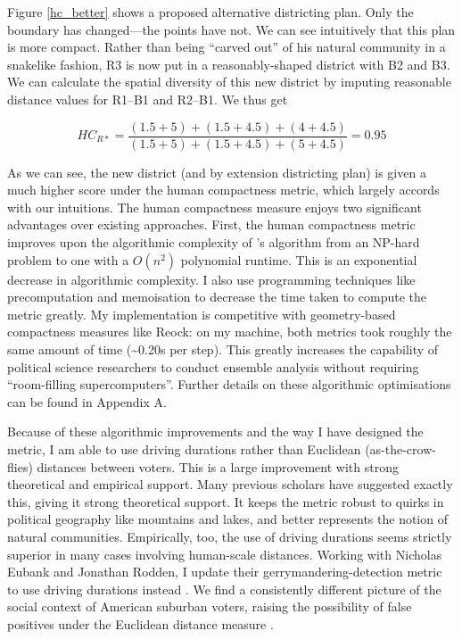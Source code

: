 \documentclass[]{article}
\begin{document}
Figure \ref{hc_better} shows a proposed alternative districting plan.
Only the boundary has changed---the points have not. We can see
intuitively that this plan is more compact. Rather than being ``carved
out'' of his natural community in a snakelike fashion, R3 is now put in
a reasonably-shaped district with B2 and B3. We can calculate the
spatial diversity of this new district by imputing reasonable distance
values for R1--B1 and R2--B1. We thus get

\[HC_{R*} = \frac{(1.5 + 5) + (1.5+4.5) + (4 + 4.5)}{(1.5+5) + (1.5+4.5) + (5+4.5)} = 0.95\]

As we can see, the new district (and by extension districting plan) is
given a much higher score under the human compactness metric, which
largely accords with our intuitions. The human compactness measure
enjoys two significant advantages over existing approaches. First, the
human compactness metric improves upon the algorithmic complexity of
\citeauthor{fh2011}'s algorithm from an NP-hard problem to one with a
\(O(n^2)\) polynomial runtime. This is an exponential decrease in
algorithmic complexity. I also use programming techniques like
precomputation and memoisation to decrease the time taken to compute the
metric greatly. My implementation is competitive with geometry-based
compactness measures like Reock: on my machine, both metrics took
roughly the same amount of time (\textasciitilde{}0.20s per step). This
greatly increases the capability of political science researchers to
conduct ensemble analysis without requiring ``room-filling
supercomputers''. Further details on these algorithmic optimisations can
be found in Appendix A.

Because of these algorithmic improvements and the way I have designed
the metric, I am able to use driving durations rather than Euclidean
(as-the-crow-flies) distances between voters. This is a large
improvement with strong theoretical and empirical support. Many previous
scholars have suggested exactly this, giving it strong theoretical
support. It keeps the metric robust to quirks in political geography
like mountains and lakes, and better represents the notion of natural
communities. Empirically, too, the use of driving durations seems
strictly superior in many cases involving human-scale distances. Working
with Nicholas Eubank and Jonathan Rodden, I update their
gerrymandering-detection metric to use driving durations instead
\citep{er2019}. We find a consistently different picture of the social
context of American suburban voters, raising the possibility of false
positives under the Euclidean distance measure \citep*{elrwp}.
\end{document}
